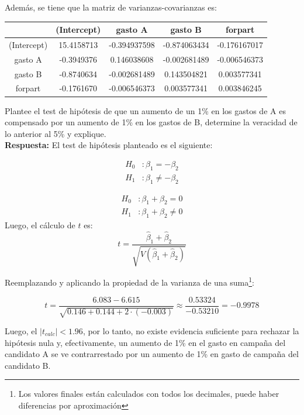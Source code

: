 \documentclass[10pt,a4paper]{article}
\begin{document}
\begin{enumerate}
Además, se tiene que la matriz de varianzas-covarianzas es:

\begin{table}[H]
    \centering
    \begin{tabular}{c|c|c|c|c}
 & (Intercept) & gasto A & gasto B	& forpart\\\hline
(Intercept)	& 15.4158713 & -0.394937598	& -0.874063434 & -0.176167017\\
gasto A	& -0.3949376 & 0.146038608 & -0.002681489 & -0.006546373\\
gasto B	& -0.8740634 & -0.002681489	& 0.143504821 & 0.003577341\\
forpart	& -0.1761670 & -0.006546373	& 0.003577341 & 0.003846245\\
    \end{tabular}
\end{table}

Plantee el test de hipótesis de que un aumento de un 1\% en los gastos de A es compensado por un aumento de 1\% en los gastos de B, determine la veracidad de lo anterior al 5\% y explique.\\
\color{blue}
\textbf{Respuesta:} El test de hipótesis planteado es el siguiente: 

\begin{align*}
    H_0 &: \beta_1 = -\beta_2\\
    H_1 &: \beta_1 \neq -\beta_2
\end{align*}

\begin{align*}
    H_0 &: \beta_1 +\beta_2=0\\
H_1 &: \beta_1 +\beta_2 \neq 0 
\end{align*}
Luego, el cálculo de $t$ es:
$$t = \frac{\widehat{\beta}_1 + \widehat{\beta}_2}{\sqrt{V(\widehat{\beta}_1 + \widehat{\beta}_2)}}$$

Reemplazando y aplicando la propiedad de la varianza de una suma\footnote{Los valores finales están calculados con todos los decimales, puede haber diferencias por aproximación}:

$$t = \frac{6.083 - 6.615}{\sqrt{0.146 + 0.144 + 2\cdot (-0.003)}} \approx \frac{0.53324}{−0.53210 }= −0.9978$$

Luego, el $|t_{calc}| < 1.96$, por lo tanto, no existe evidencia suficiente para rechazar la hipótesis nula y, efectivamente, un aumento de 1\% en el gasto en campaña del candidato A se ve contrarrestado por un aumento de 1\% en gasto de campaña del candidato B.
    \end{enumerate}
\color{black}
\end{document}
